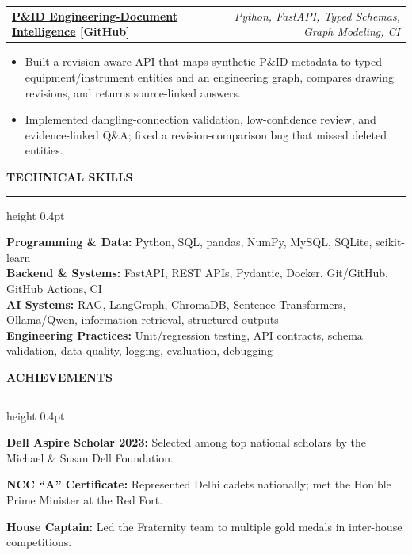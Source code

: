 \documentclass[10pt,a4paper]{article}
\makeatletter
\newcommand{\ressection}[1]{%
  \vspace{4.8pt}%
  {\fontsize{10.2}{11.2}\selectfont\bfseries\MakeUppercase{#1}}\par
  \vspace{2.3pt}\hrule height 0.4pt\vspace{3.6pt}%
}
\newcommand{\projectheading}[3]{%
  \begin{tabular*}{\textwidth}{@{\extracolsep{\fill}}lr}
    \textbf{\href{#2}{#1} \textcolor{linkblue}{[GitHub]}} & {\textit{\fontsize{8.2}{9.1}\selectfont #3}}
  \end{tabular*}\par
}
\newenvironment{resbullets}{%
  \begin{itemize}[leftmargin=11pt,label=\textbullet,itemsep=0pt,topsep=1.2pt,parsep=0pt,partopsep=0pt]
  \fontsize{9.55}{10.95}\selectfont
}{\end{itemize}\vspace{1pt}}
\makeatother
\begin{document}
\projectheading{P\&ID Engineering-Document Intelligence}{https://github.com/Nothing0g/pid-engineering-document-intelligence}{Python, FastAPI, Typed Schemas, Graph Modeling, CI}
\begin{resbullets}
  \item Built a revision-aware API that maps synthetic P\&ID metadata to typed equipment/instrument entities and an engineering graph, compares drawing revisions, and returns source-linked answers.
  \item Implemented dangling-connection validation, low-confidence review, and evidence-linked Q\&A; fixed a revision-comparison bug that missed deleted entities.
\end{resbullets}

\ressection{Technical Skills}
\textbf{Programming \& Data:} Python, SQL, pandas, NumPy, MySQL, SQLite, scikit-learn\\
\textbf{Backend \& Systems:} FastAPI, REST APIs, Pydantic, Docker, Git/GitHub, GitHub Actions, CI\\
\textbf{AI Systems:} RAG, LangGraph, ChromaDB, Sentence Transformers, Ollama/Qwen, information retrieval, structured outputs\\
\textbf{Engineering Practices:} Unit/regression testing, API contracts, schema validation, data quality, logging, evaluation, debugging

\ressection{Achievements}
\textbf{Dell Aspire Scholar 2023:} Selected among top national scholars by the Michael \& Susan Dell Foundation.\par
\textbf{NCC ``A'' Certificate:} Represented Delhi cadets nationally; met the Hon'ble Prime Minister at the Red Fort.\par
\textbf{House Captain:} Led the Fraternity team to multiple gold medals in inter-house competitions.
\end{document}
